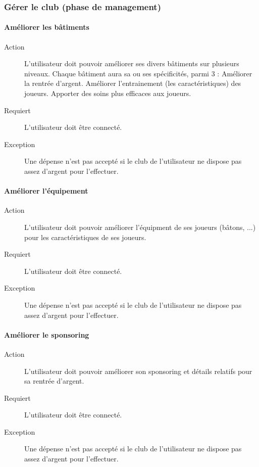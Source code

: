 \documentclass[a4paper]{article}
\begin{document}
\subsubsection{Gérer le \gls{club} (phase de management)}
\paragraph{Améliorer les bâtiments}
\begin{description}
\item[Action] L'\gls{utilisateur} doit pouvoir améliorer ses divers bâtiments sur plusieurs niveaux. Chaque bâtiment aura sa ou ses spécificités, parmi 3 :
Améliorer la rentrée d'argent.
Améliorer l'entrainement (les caractéristiques) des joueurs.
Apporter des soins plus efficaces aux joueurs.
\item[Requiert] L'\gls{utilisateur} doit être connecté.
\item[Exception] Une dépense n'est pas accepté si le \gls{club} de l'\gls{utilisateur} ne dispose pas assez d'argent pour l'effectuer.
\end{description}
\paragraph{Améliorer l'équipement}
\begin{description}
\item[Action] L'\gls{utilisateur} doit pouvoir améliorer l'équipment de ses joueurs (bâtons, ...) pour les caractéristiques de ses joueurs.
\item[Requiert] L'\gls{utilisateur} doit être connecté.
\item[Exception] Une dépense n'est pas accepté si le \gls{club} de l'\gls{utilisateur} ne dispose pas assez d'argent pour l'effectuer.
\end{description}
\paragraph{Améliorer le sponsoring}
\begin{description}
\item[Action] L'\gls{utilisateur} doit pouvoir améliorer son sponsoring et détails relatifs pour sa rentrée d'argent.
\item[Requiert] L'\gls{utilisateur} doit être connecté.
\item[Exception] Une dépense n'est pas accepté si le \gls{club} de l'\gls{utilisateur} ne dispose pas assez d'argent pour l'effectuer.
\end{description}
\end{document}
